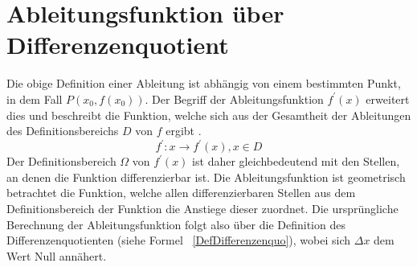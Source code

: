\documentclass[11pt, a4paper]{report}
\begin{document}
\section{Ableitungsfunktion über Differenzenquotient}
Die obige Definition einer Ableitung ist  abhängig von einem bestimmten Punkt, in dem Fall $P(x_0, f(x_0))$. Der Begriff der Ableitungsfunktion $f^{\prime}(x)$ erweitert dies und beschreibt die Funktion, welche sich aus der Gesamtheit der Ableitungen des Definitionsbereichs $D$ von $f$ ergibt \cite[Seite 19]{Borgwadt.1994}.
\begin{equation}
f^{\prime}:x \rightarrow f^{\prime}(x), x \in D
\end{equation}
Der Definitionsbereich $\Omega$ von $f^{\prime}(x)$ ist daher gleichbedeutend mit den Stellen, an denen die Funktion differenzierbar ist. Die Ableitungsfunktion ist geometrisch betrachtet die Funktion, welche allen differenzierbaren Stellen aus dem Definitionsbereich der Funktion die Anstiege dieser zuordnet. 
Die ursprüngliche Berechnung der Ableitungsfunktion folgt also über die Definition des Differenzenquotienten (siehe Formel ~\ref{DefDifferenzenquo}), wobei sich $\Delta x$ dem Wert Null annähert.
\end{document}
